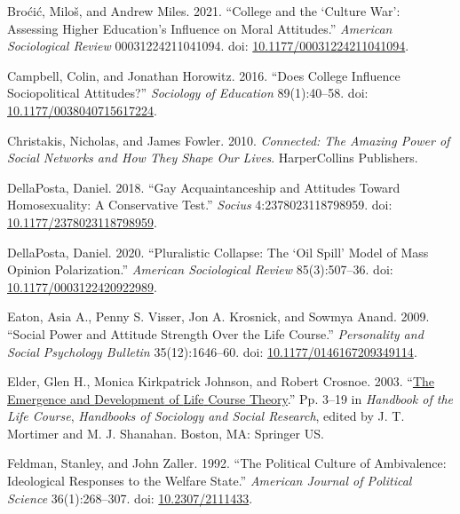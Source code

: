 \documentclass[
  12pt,
]{article}
\newlength{\cslhangindent}
\newlength{\cslentryspacingunit} %
\newenvironment{CSLReferences}[2] %
 {%
  \setlength{\parindent}{0pt}
  \ifodd #1
  \let\oldpar\par
  \def\par{\hangindent=\cslhangindent\oldpar}
  \fi
  \setlength{\parskip}{#2\cslentryspacingunit}
 }%
 {}
\begin{document}
\begin{CSLReferences}{1}{0}
\leavevmode{}%
Broćić, Miloš, and Andrew Miles. 2021. {``College and the {`{Culture}
{War}'}: {Assessing} {Higher} {Education}'s {Influence} on {Moral}
{Attitudes}.''} \emph{American Sociological Review} 00031224211041094.
doi:
\href{https://doi.org/10.1177/00031224211041094}{10.1177/00031224211041094}.

\leavevmode{}%
Campbell, Colin, and Jonathan Horowitz. 2016. {``Does {College}
{Influence} {Sociopolitical} {Attitudes}?''} \emph{Sociology of
Education} 89(1):40--58. doi:
\href{https://doi.org/10.1177/0038040715617224}{10.1177/0038040715617224}.

\leavevmode{}%
Christakis, Nicholas, and James Fowler. 2010. \emph{Connected: {The}
{Amazing} {Power} of {Social} {Networks} and {How} {They} {Shape} {Our}
{Lives}}. HarperCollins Publishers.

\leavevmode{}%
DellaPosta, Daniel. 2018. {``Gay {Acquaintanceship} and {Attitudes}
Toward {Homosexuality}: {A} {Conservative} {Test}.''} \emph{Socius}
4:2378023118798959. doi:
\href{https://doi.org/10.1177/2378023118798959}{10.1177/2378023118798959}.

\leavevmode{}%
DellaPosta, Daniel. 2020. {``Pluralistic {Collapse}: {The} {`{Oil}
{Spill}'} {Model} of {Mass} {Opinion} {Polarization}.''} \emph{American
Sociological Review} 85(3):507--36. doi:
\href{https://doi.org/10.1177/0003122420922989}{10.1177/0003122420922989}.

\leavevmode{}%
Eaton, Asia A., Penny S. Visser, Jon A. Krosnick, and Sowmya Anand.
2009. {``Social {Power} and {Attitude} {Strength} {Over} the {Life}
{Course}.''} \emph{Personality and Social Psychology Bulletin}
35(12):1646--60. doi:
\href{https://doi.org/10.1177/0146167209349114}{10.1177/0146167209349114}.

\leavevmode{}%
Elder, Glen H., Monica Kirkpatrick Johnson, and Robert Crosnoe. 2003.
{``\href{https://doi.org/10.1007/978-0-306-48247-2_1}{The {Emergence}
and {Development} of {Life} {Course} {Theory}}.''} Pp. 3--19 in
\emph{Handbook of the {Life} {Course}}, \emph{Handbooks of {Sociology}
and {Social} {Research}}, edited by J. T. Mortimer and M. J. Shanahan.
Boston, MA: Springer US.

\leavevmode{}%
Feldman, Stanley, and John Zaller. 1992. {``The {Political} {Culture} of
{Ambivalence}: {Ideological} {Responses} to the {Welfare} {State}.''}
\emph{American Journal of Political Science} 36(1):268--307. doi:
\href{https://doi.org/10.2307/2111433}{10.2307/2111433}.


\end{CSLReferences}
\end{document}
